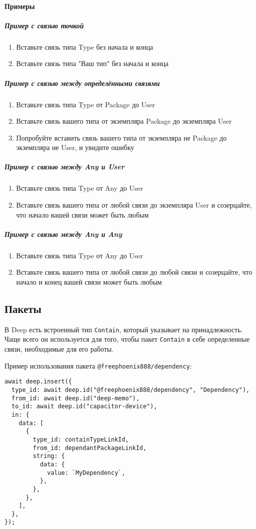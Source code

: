 \documentclass{article}
\begin{document}
\paragraph{Примеры}
\subparagraph{Пример с связью точкой}
\begin{enumerate}
    \item Вставьте связь типа Type без начала и конца
    \item Вставьте связь типа "Ваш тип" без начала и конца
\end{enumerate}
\subparagraph{Пример с связью между определёнными связями}
\begin{enumerate}
    \item Вставьте связь типа Type от Package до User
    \item Вставьте связь вашего типа от экземпляра Package до экземпляра User
    \item Попробуйте вставить связь вашего типа от экземпляра не Package до экземпляра не User, и увидите ошибку
\end{enumerate}
\subparagraph{Пример с связью между Any и User}
\begin{enumerate}
    \item Вставьте связь типа Type от Any до User
    \item Вставьте связь вашего типа от любой связи до экземпляра User и созерцайте, что начало вашей связи может быть любым
\end{enumerate}
\subparagraph{Пример с связью между Any и Any}
\begin{enumerate}
    \item Вставьте связь типа Type от Any до User
    \item Вставьте связь вашего типа от любой связи до любой связи и созерцайте, что начало и конец вашей связи может быть любым
\end{enumerate}
\subsection{Пакеты}

В Deep есть встроенный тип \texttt{Contain}, который указывает на принадлежность. Чаще всего он используется для того, чтобы пакет \texttt{Contain} в себе определенные связи, необходимые для его работы.

Пример использования пакета \texttt{@freephoenix888/dependency}:

\begin{verbatim}
await deep.insert({
  type_id: await deep.id("@freephoenix888/dependency", "Dependency"),
  from_id: await deep.id("deep-memo"),
  to_id: await deep.id("capacitor-device"),
  in: {
    data: [
      {
        type_id: containTypeLinkId,
        from_id: dependantPackageLinkId,
        string: {
          data: {
            value: `MyDependency`,
          },
        },
      },
    ],
  },
});
\end{verbatim}
\end{document}
